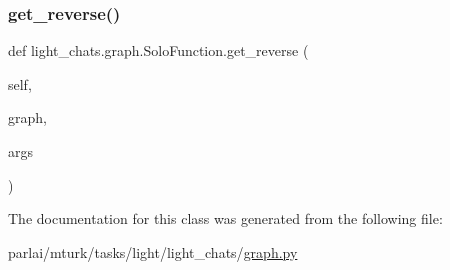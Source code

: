 \subsubsection{\texorpdfstring{get\+\_\+reverse()}{get\_reverse()}}
{\footnotesize\ttfamily def light\+\_\+chats.\+graph.\+Solo\+Function.\+get\+\_\+reverse (\begin{DoxyParamCaption}\item[{}]{self,  }\item[{}]{graph,  }\item[{}]{args }\end{DoxyParamCaption})}



The documentation for this class was generated from the following file\+:\begin{DoxyCompactItemize}
\item 
parlai/mturk/tasks/light/light\+\_\+chats/\hyperlink{parlai_2mturk_2tasks_2light_2light__chats_2graph_8py}{graph.\+py}\end{DoxyCompactItemize}

